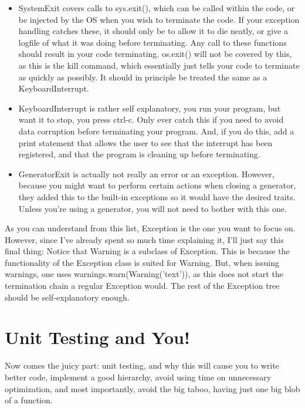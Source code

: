 \documentclass[10pt,a4paper]{article}
\begin{document}
\begin{itemize}

\item SystemExit covers calls to sys.exit(), which can be called within the code, or be injected by the OS when you wish to terminate the code. If your exception handling catches these, it should only be to allow it to die neatly, or give a logfile of what it was doing before terminating. Any call to these functions should result in your code terminating. os.exit() will not be covered by this, as this is the kill command, which essentially just tells your code to terminate as quickly as possibly. It should in principle be treated the same as a KeyboardInterrupt.

\item KeyboardInterrupt is rather self explanatory, you run your program, but want it to stop, you press ctrl-c. Only ever catch this if you need to avoid data corruption before terminating your program. And, if you do this, add a print statement that allows the user to see that the interrupt has been registered, and that the program is cleaning up before terminating.

\item GeneratorExit is actually not really an error or an exception. However, because you might want to perform certain actions when closing a generator, they added this to the built-in exceptions so it would have the desired traits. Unless you're using a generator, you will not need to bother with this one.

\end{itemize}

As you can understand from this list, Exception is the one you want to focus on. However, since I've already spent so much time explaining it, I'll just say this final thing: Notice that Warning is a subclass of Exception. This is because the functionality of the Exception class is suited for Warning. But, when issuing warnings, one uses warnings.warn(Warning('text')), as this does not start the termination chain a regular Exception would. The rest of the Exception tree should be self-explanatory enough. 


\section{Unit Testing and You!}


Now comes the juicy part: unit testing, and why this will cause you to write better code, implement a good hierarchy, avoid using time on unnecessary optimization, and most importantly, avoid the big taboo, having just one big blob of a function.
\end{document}
